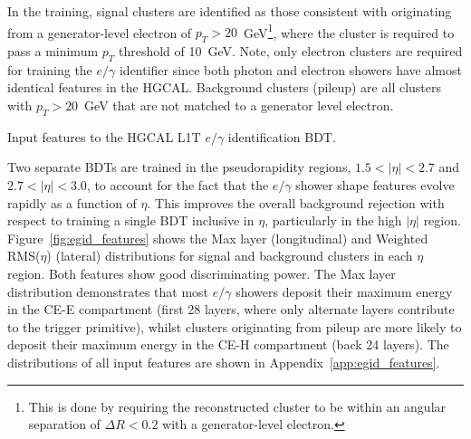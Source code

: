 In the training, signal clusters are identified as those consistent with originating from a generator-level electron of $p_T > 20$~GeV\footnote{This is done by requiring the reconstructed cluster to be within an angular separation of $\Delta R<0.2$ with a generator-level electron.}, where the cluster is required to pass a minimum $p_T$ threshold of 10~GeV. Note, only electron clusters are required for training the $e/\gamma$ identifier since both photon and electron showers have almost identical features in the HGCAL. Background clusters (pileup) are all clusters with $p_T>20$~GeV that are not matched to a generator level electron. 

\begin{table}[htb!]
    \caption[HGCAL L1T $e/\gamma$ identification BDT input features]{Input features to the HGCAL L1T $e/\gamma$ identification BDT.}
    \label{tab:egid_features}
    \centering
    \scriptsize
    \renewcommand{\arraystretch}{2}
    \hspace*{-1.5cm}
    
    \hspace*{-1.5cm}
\end{table}

Two separate BDTs are trained in the pseudorapidity regions, $1.5<|\eta|<2.7$ and $2.7<|\eta|<3.0$, to account for the fact that the $e/\gamma$ shower shape features evolve rapidly as a function of $\eta$. This improves the overall background rejection with respect to training a single BDT inclusive in $\eta$, particularly in the high $|\eta|$ region. Figure~\ref{fig:egid_features} shows the Max layer (longitudinal) and Weighted RMS($\eta$) (lateral) distributions for signal and background clusters in each $\eta$ region. Both features show good discriminating power. The Max layer distribution demonstrates that most $e/\gamma$ showers deposit their maximum energy in the CE-E compartment (first 28 layers, where only alternate layers contribute to the trigger primitive), whilst clusters originating from pileup are more likely to deposit their maximum energy in the CE-H compartment (back 24 layers). The distributions of all input features are shown in Appendix~\ref{app:egid_features}.

